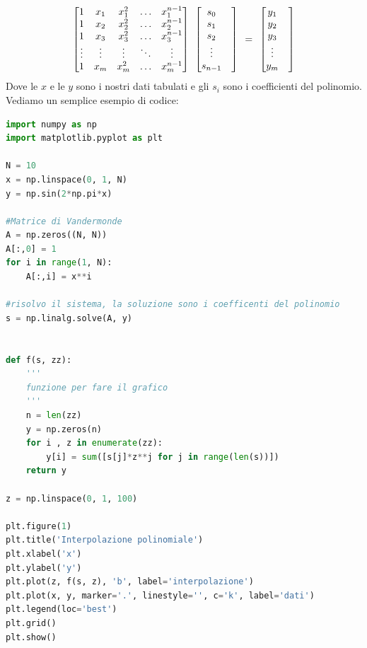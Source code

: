\documentclass[10pt,a4paper]{article}
\begin{document}
\[
\begin{bmatrix}
1 & x_1 & x_1^2 & \dots & x_1^{n-1}\\
1 & x_2 & x_2^2 & \dots & x_2^{n-1}\\
1 & x_3 & x_3^2 & \dots & x_3^{n-1}\\
\vdots & \vdots & \vdots & \ddots &\vdots \\
1 & x_m & x_m^2 & \dots & x_m^{n-1}
\end{bmatrix}
\hspace{1.5 mm}
\begin{bmatrix}
  s_0 & \\
  s_1 & \\
  s_2 & \\
  \vdots & \\
  s_{n-1} &
\end{bmatrix}
\hspace{1.5 mm} = \hspace{1.5 mm}
\begin{bmatrix}
  y_1 & \\
  y_2 & \\
  y_3 & \\
  \vdots & \\
  y_m &
\end{bmatrix}
\]
Dove le $x$ e le $y$ sono i nostri dati tabulati e gli $s_i$ sono i coefficienti del polinomio. Vediamo un semplice esempio di codice:

\begin{lstlisting}[language=Python]
import numpy as np
import matplotlib.pyplot as plt

N = 10
x = np.linspace(0, 1, N)
y = np.sin(2*np.pi*x)

#Matrice di Vandermonde
A = np.zeros((N, N))
A[:,0] = 1
for i in range(1, N):
    A[:,i] = x**i

#risolvo il sistema, la soluzione sono i coefficenti del polinomio
s = np.linalg.solve(A, y)


def f(s, zz):
    '''
    funzione per fare il grafico
    '''
    n = len(zz)
    y = np.zeros(n)
    for i , z in enumerate(zz):
        y[i] = sum([s[j]*z**j for j in range(len(s))])
    return y

z = np.linspace(0, 1, 100)

plt.figure(1)
plt.title('Interpolazione polinomiale')
plt.xlabel('x')
plt.ylabel('y')
plt.plot(z, f(s, z), 'b', label='interpolazione')
plt.plot(x, y, marker='.', linestyle='', c='k', label='dati')
plt.legend(loc='best')
plt.grid()
plt.show()
\end{lstlisting}
\end{document}
